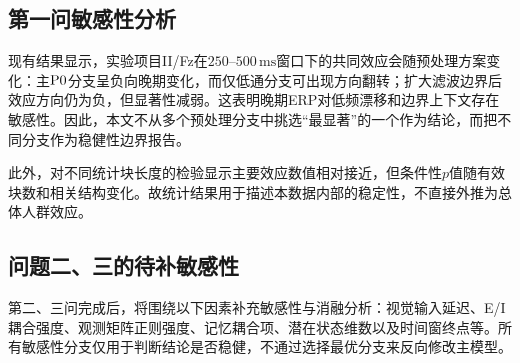\subsection{第一问敏感性分析}

现有结果显示，实验项目II/Fz在$250$--$500\,\mathrm{ms}$窗口下的共同效应会随预处理方案变化：主$\mathrm{P0}$分支呈负向晚期变化，而仅低通分支可出现方向翻转；扩大滤波边界后效应方向仍为负，但显著性减弱。这表明晚期ERP对低频漂移和边界上下文存在敏感性。因此，本文不从多个预处理分支中挑选“最显著”的一个作为结论，而把不同分支作为稳健性边界报告。

此外，对不同统计块长度的检验显示主要效应数值相对接近，但条件性$p$值随有效块数和相关结构变化。故统计结果用于描述本数据内部的稳定性，不直接外推为总体人群效应。

\subsection{问题二、三的待补敏感性}

第二、三问完成后，将围绕以下因素补充敏感性与消融分析：视觉输入延迟、E/I耦合强度、观测矩阵正则强度、记忆耦合项、潜在状态维数以及时间窗终点等。所有敏感性分支仅用于判断结论是否稳健，不通过选择最优分支来反向修改主模型。
